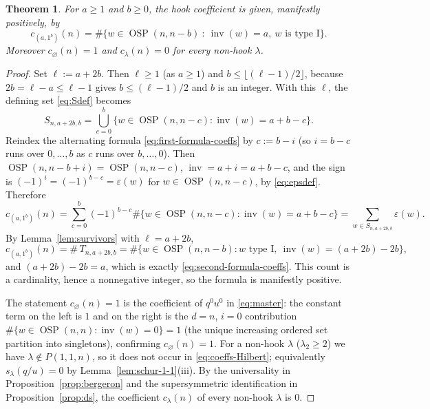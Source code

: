 \documentclass[11pt]{amsart}
\newtheorem{theorem}{Theorem}
\theoremstyle{definition}
\DeclareMathOperator{\OSP}{OSP}
\DeclareMathOperator{\inv}{inv}
\begin{document}
\begin{theorem}\label{thm:improved-coefficient-formula}
For $a\ge1$ and $b\ge0$, the hook coefficient is given, manifestly positively, by
\begin{equation}\label{eq:second-formula-coeffs}
c_{(a,1^b)}(n)=\#\{w\in\OSP(n,n-b)\ :\ \inv(w)=a,\ w\text{ is type I}\}.
\end{equation}
Moreover $c_\varnothing(n)=1$ and $c_\lambda(n)=0$ for every non-hook $\lambda$.
\end{theorem}

\begin{proof}
Set $\ell:=a+2b$. Then $\ell\ge1$ (as $a\ge1$) and
$b\le\lfloor(\ell-1)/2\rfloor$, because $2b=\ell-a\le\ell-1$ gives
$b\le(\ell-1)/2$ and $b$ is an integer. With this $\ell$, the defining set
\eqref{eq:Sdef} becomes
\begin{equation}
S_{n,a+2b,b}=\bigcup_{c=0}^b\{w\in\OSP(n,n-c):\inv(w)=a+b-c\}.
\end{equation}
Reindex the alternating formula \eqref{eq:first-formula-coeffs} by
$c:=b-i$ (so $i=b-c$ runs over $0,\dots,b$ as $c$ runs over $b,\dots,0$). Then
$\OSP(n,n-b+i)=\OSP(n,n-c)$, $\inv=a+i=a+b-c$, and the sign is
$(-1)^i=(-1)^{b-c}=\varepsilon(w)$ for $w\in\OSP(n,n-c)$, by \eqref{eq:epsdef}.
Therefore
\begin{equation}
c_{(a,1^b)}(n)
=\sum_{c=0}^b(-1)^{b-c}\#\{w\in\OSP(n,n-c):\inv(w)=a+b-c\}
=\sum_{w\in S_{n,a+2b,b}}\varepsilon(w).
\end{equation}
By Lemma~\ref{lem:survivors} with $\ell=a+2b$,
\begin{equation}
c_{(a,1^b)}(n)=\#\,T_{n,a+2b,b}
=\#\{w\in\OSP(n,n-b):w\text{ type I},\ \inv(w)=(a+2b)-2b\},
\end{equation}
and $(a+2b)-2b=a$, which is exactly \eqref{eq:second-formula-coeffs}. This count
is a cardinality, hence a nonnegative integer, so the formula is manifestly
positive.

The statement $c_\varnothing(n)=1$ is the coefficient of $q^0u^0$ in
\eqref{eq:master}: the constant term on the left is $1$ and on the right is the
$d=n$, $i=0$ contribution $\#\{w\in\OSP(n,n):\inv(w)=0\}=1$ (the unique increasing
ordered set partition into singletons), confirming $c_\varnothing(n)=1$. For a
non-hook $\lambda$ ($\lambda_2\ge2$) we have $\lambda\notin P(1,1,n)$, so it does
not occur in \eqref{eq:coeffs-Hilbert}; equivalently $s_\lambda(q/u)=0$ by
Lemma~\ref{lem:schur-1-1}(iii). By the universality in
Proposition~\ref{prop:bergeron} and the supersymmetric identification in
Proposition~\ref{prop:ds}, the coefficient $c_\lambda(n)$ of every non-hook
$\lambda$ is $0$.
\end{proof}
\end{document}
